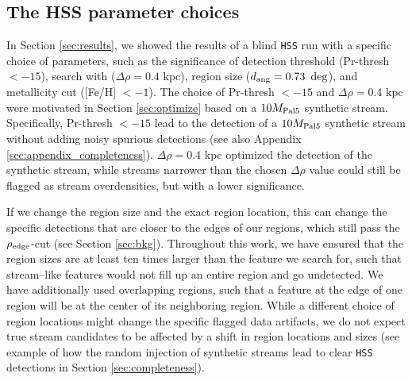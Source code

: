 \documentclass[twocolumn]{aastex631}
\begin{document}
\subsection{The HSS parameter choices}\label{sec:performance}
In Section \ref{sec:results}, we showed the results of a blind \texttt{HSS} run with a specific choice of parameters, such as the significance of detection threshold (Pr-thresh $<-15$), search with ($\Delta\rho = 0.4$ kpc), region size ($d_{\rm ang} = 0.73~ \deg$), and metallicity cut ([Fe/H] $< -1$). The choice of Pr-thresh $<-15$ and $\Delta\rho = 0.4$ kpc were motivated in Section \ref{sec:optimize} based on a $10{M}_{\rm Pal 5}$ synthetic stream. Specifically, Pr-thresh $<-15$ lead to the detection of a $10{M}_{\rm Pal 5}$ synthetic stream without adding noisy spurious detections (see also Appendix \ref{sec:appendix_completeness}).  $\Delta\rho = 0.4$ kpc optimized the detection of the synthetic stream, while streams narrower than the chosen $\Delta\rho$ value could still be flagged as stream overdensities, but with a lower significance. 

If we change the region size and the exact region location, this can change the specific detections that are closer to the edges of our regions, which still pass the $\rho_{\rm edge}$-cut (see Section \ref{sec:bkg}). Throughout this work, we have ensured that the region sizes are at least ten times larger than the feature we search for, such that stream--like features would not fill up an entire region and go undetected. We have additionally used overlapping regions, such that a feature at the edge of one region will be at the center of its neighboring region. 
While a different choice of region locations might change the specific flagged data artifacts, we do not expect true stream candidates to be affected by a shift in region locations and sizes (see example of how the random injection of synthetic streams lead to clear \texttt{HSS} detections in Section \ref{sec:completeness}). 
\end{document}

